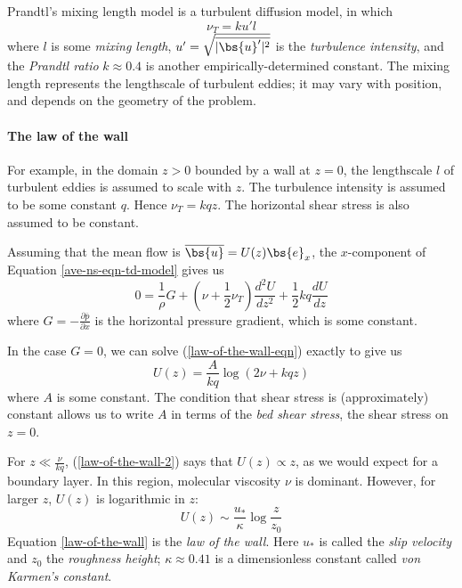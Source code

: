 Prandtl's mixing length model is a turbulent diffusion model, in which
\begin{equation}
    \nu_T = k u' l
\end{equation}
where $l$ is some \textit{mixing length}, $u'=\sqrt{\overline{|\bs{u}'|^2}}$
is the \textit{turbulence intensity}, and the \textit{Prandtl ratio}
$k\approx0.4$ is another empirically-determined constant. The mixing length
represents the lengthscale of turbulent eddies; it may vary with position, and
depends on the geometry of the problem. 

\paragraph{The law of the wall} For example, in the domain $z>0$ bounded by a
wall at $z=0$, the lengthscale $l$ of turbulent eddies is assumed to scale with
$z$. The turbulence intensity is assumed to be some constant $q$. Hence $\nu_T =
kqz$.  The horizontal shear stress is also assumed to be constant. 

Assuming that the mean flow is $\overline{\bs{u}} = U(z) \bs{e}_x$, the
$x$-component of Equation \ref{ave-ns-eqn-td-model} gives us
\begin{equation}
    0 = \frac{1}{\rho} G
    + \left(\nu+\frac{1}{2}\nu_T\right)\frac{d^2U}{dz^2}
    + \frac{1}{2}kq \frac{dU}{dz}
    \label{law-of-the-wall-eqn}
\end{equation}
where $G = -\frac{\partial\overline{p}}{\partial x}$ is the horizontal pressure
gradient, which is some constant. 

In the case $G=0$, we can solve (\ref{law-of-the-wall-eqn}) exactly to give us
\begin{equation}
    U(z) = \frac{A}{kq} \log(2\nu + kqz)
    \label{law-of-the-wall-2}
\end{equation}
where $A$ is some constant. The condition that shear stress is (approximately)
constant allows us to write $A$ in terms of the \textit{bed shear stress}, the
shear stress on $z=0$.

For $z\ll\frac{\nu}{kq}$, (\ref{law-of-the-wall-2}) says that $U(z)\propto z$,
as we would expect for a boundary layer. In this region, molecular viscosity
$\nu$ is dominant. However, for larger $z$, $U(z)$ is logarithmic in $z$:
\begin{equation}
\boxed{
    U(z) \sim \frac{u_*}{\kappa} \log\frac{z}{z_0}
    \label{law-of-the-wall}
}
\end{equation}
Equation \ref{law-of-the-wall} is the \textit{law of the wall}. Here $u_*$ is called the \textit{slip velocity} and $z_0$ the \textit{roughness height}; $\kappa\approx0.41$ is a dimensionless constant called \textit{von Karmen's constant}. 

